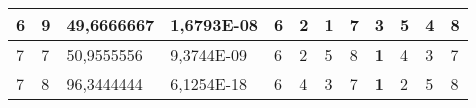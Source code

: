 \documentclass[conference]{IEEEtran}
\begin{document}
\begin{table*}[]
\begin{tabular}{|llll|llllllll|}
\multicolumn{1}{|l|}{6}                                                     & \multicolumn{1}{l|}{9}                                                        & \multicolumn{1}{l|}{49,6666667}                                                   & 1,6793E-08                     & \multicolumn{1}{l|}{6}                                                  & \multicolumn{1}{l|}{2}                                                  & \multicolumn{1}{l|}{\textbf{1}}                                         & \multicolumn{1}{l|}{7}                                                  & \multicolumn{1}{l|}{3}                                                  & \multicolumn{1}{l|}{5}                                                  & \multicolumn{1}{l|}{4}                                                  & 8                          \\ \hline
\multicolumn{1}{|l|}{7}                                                     & \multicolumn{1}{l|}{7}                                                        & \multicolumn{1}{l|}{50,9555556}                                                   & 9,3744E-09                     & \multicolumn{1}{l|}{6}                                                  & \multicolumn{1}{l|}{2}                                                  & \multicolumn{1}{l|}{5}                                                  & \multicolumn{1}{l|}{8}                                                  & \multicolumn{1}{l|}{\textbf{1}}                                         & \multicolumn{1}{l|}{4}                                                  & \multicolumn{1}{l|}{3}                                                  & 7                          \\ \hline
\multicolumn{1}{|l|}{7}                                                     & \multicolumn{1}{l|}{8}                                                        & \multicolumn{1}{l|}{96,3444444}                                                   & 6,1254E-18                     & \multicolumn{1}{l|}{6}                                                  & \multicolumn{1}{l|}{4}                                                  & \multicolumn{1}{l|}{3}                                                  & \multicolumn{1}{l|}{7}                                                  & \multicolumn{1}{l|}{\textbf{1}}                                         & \multicolumn{1}{l|}{2}                                                  & \multicolumn{1}{l|}{5}                                                  & 8                          \\ \hline

\end{tabular}
\end{table*}
\end{document}
